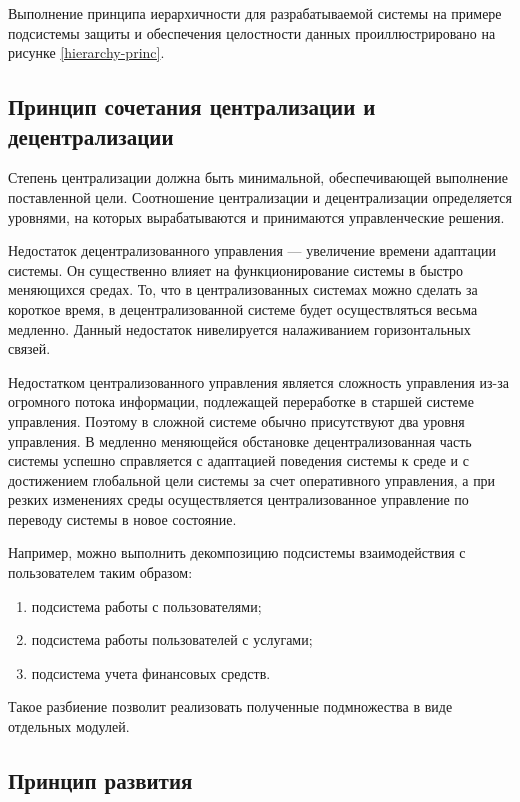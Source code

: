Выполнение принципа иерархичности для разрабатываемой системы на примере подсистемы защиты и обеспечения целостности данных проиллюстрировано на рисунке \ref{hierarchy-princ}.

\subsection{Принцип сочетания централизации и децентрализации}

Степень централизации должна быть минимальной, обеспечивающей выполнение поставленной цели.
Соотношение централизации и децентрализации определяется уровнями, на которых вырабатываются и принимаются управленческие решения.

Недостаток децентрализованного управления --- увеличение времени адаптации системы.
Он существенно влияет на функционирование системы в быстро меняющихся средах.
То, что в централизованных системах можно сделать за короткое время, в децентрализованной системе будет осуществляться весьма медленно.
Данный недостаток нивелируется налаживанием горизонтальных связей.

Недостатком централизованного управления является сложность управления из-за огромного потока информации, подлежащей переработке в старшей системе управления.
Поэтому в сложной системе обычно присутствуют два уровня управления.
В медленно меняющейся обстановке децентрализованная часть системы успешно справляется с адаптацией поведения системы к среде и с достижением глобальной цели системы за счет оперативного управления, а при резких изменениях среды осуществляется централизованное управление по переводу системы в новое состояние.

Например, можно выполнить декомпозицию подсистемы взаимодействия с пользователем таким образом:
\begin{enumerate}
  \item подсистема работы с пользователями;
  \item подсистема работы пользователей с услугами;
  \item подсистема учета финансовых средств.
\end{enumerate}

Такое разбиение позволит реализовать полученные подмножества в виде отдельных модулей.

\subsection{Принцип развития}

